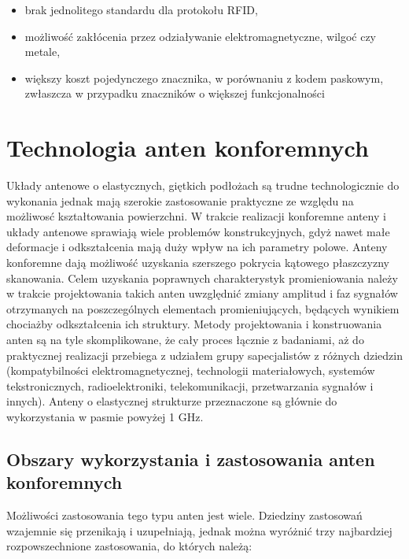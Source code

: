 \begin{itemize}\setlength{\itemsep}{0pt}

	\item brak jednolitego standardu dla protokołu RFID,
	
	\item możliwość zakłócenia przez odziaływanie elektromagnetyczne, wilgoć czy metale,
 	
 	\item większy koszt pojedynczego znacznika, w porównaniu z kodem paskowym, zwłaszcza w przypadku znaczników o większej funkcjonalności 

\end{itemize}





\chapter{Technologia anten konforemnych}

Układy antenowe o elastycznych, giętkich podłożach są trudne technologicznie do wykonania jednak mają szerokie zastosowanie praktyczne ze względu na możliwosć kształtowania powierzchni. 
W trakcie realizacji konforemne anteny i układy antenowe sprawiają wiele problemów konstrukcyjnych, gdyż nawet małe deformacje i odkształcenia mają duży wpływ na ich parametry polowe. 
Anteny konforemne dają możliwość uzyskania szerszego pokrycia kątowego płaszczyzny skanowania. Celem uzyskania poprawnych charakterystyk promieniowania należy w trakcie projektowania takich anten uwzględnić zmiany amplitud i faz sygnałów otrzymanych na poszczególnych elementach promieniujących, będących wynikiem chociażby odkształcenia ich struktury.    
Metody projektowania i konstruowania anten są na tyle skomplikowane, że cały proces łącznie z badaniami, aż do praktycznej realizacji przebiega z udziałem grupy sapecjalistów z różnych dziedzin (kompatybilności elektromagnetycznej, technologii materiałowych, systemów tekstronicznych, radioelektroniki, telekomunikacji, przetwarzania sygnałów i innych). Anteny o elastycznej strukturze przeznaczone są głównie do wykorzystania w pasmie powyżej 1 GHz.     

\section{Obszary wykorzystania i zastosowania anten konforemnych}

Możliwości zastosowania tego typu anten jest wiele. Dziedziny zastosowań wzajemnie się przenikają i uzupełniają, jednak można wyróżnić trzy najbardziej rozpowszechnione zastosowania, do których należą:

